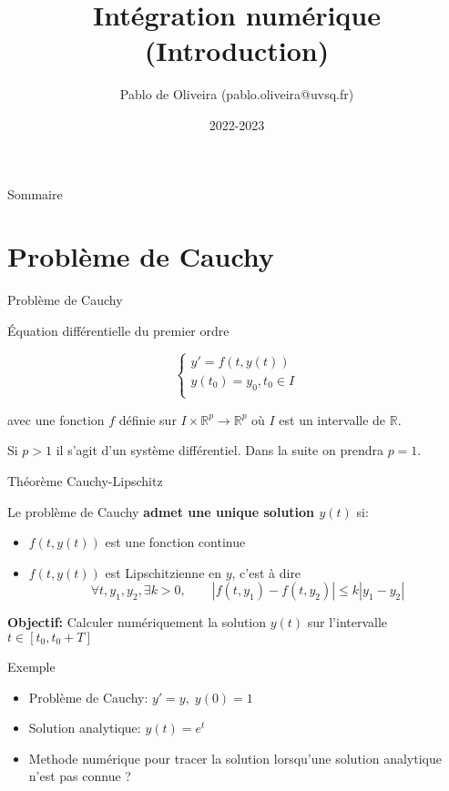 \documentclass{beamer}
\title{Intégration numérique (Introduction)}
\author{Pablo de Oliveira (pablo.oliveira@uvsq.fr)}
\institute{M1 Calcul Haute Performance Simulation, Calcul Numérique}
\date{2022-2023}
\begin{document}
\maketitle

\begin{frame}{Sommaire}
    \tableofcontents
\end{frame}

\section{Problème de Cauchy}
\begin{frame}{Problème de Cauchy}

    Équation différentielle du premier ordre

    \begin{equation*}
        \left\{
        \begin{array}{l}
            y' = f(t,y(t))          \\
            y(t_0) = y_0, t_0 \in I \\
        \end{array}
        \right.
    \end{equation*}

    avec une fonction $f$ définie sur $I \times \mathbb{R}^p \rightarrow \mathbb{R}^p$ où $I$ est un intervalle de $\mathbb{R}$.

    Si $p > 1$ il s'agit d'un système différentiel. Dans la suite on prendra $p = 1$.
\end{frame}

\begin{frame}{Théorème Cauchy-Lipschitz}

    Le problème de Cauchy \textbf{admet une unique solution $y(t)$} si:
    \begin{itemize}
        \item $f(t, y(t))$ est une fonction continue
        \item $f(t, y(t))$ est Lipschitzienne en $y$, c'est à dire
              \[ \forall t,y_1,y_2, \exists k > 0, \qquad |f(t,y_1) - f(t,y_2)| \leq k|y_1-y_2| \]
    \end{itemize}
    \vfill

    \textbf{Objectif:} Calculer numériquement la solution $y(t)$ sur l'intervalle $t \in [t_0,t_0+T]$

\end{frame}

\begin{frame}{Exemple}
    \begin{itemize}
        \item Problème de Cauchy: $ y'=y,\; y(0) = 1$

        \item Solution analytique: $y(t)=e^t$

        \item Methode numérique pour tracer la solution lorsqu'une solution analytique n'est pas connue ?
    \end{itemize}

\end{frame}
\end{document}
